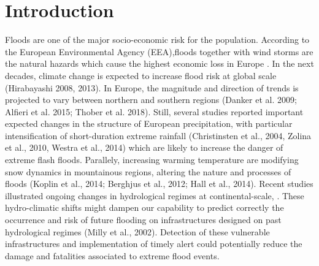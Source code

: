 \chapter{Introduction}
\label{chp:introduction}

\newcommand{\keyword}[1]{\textbf{#1}}
\newcommand{\tabhead}[1]{\textbf{#1}}
\newcommand{\code}[1]{\texttt{#1}}
\newcommand{\file}[1]{\texttt{\bfseries#1}}
\newcommand{\option}[1]{\texttt{\itshape#1}}

Floods are one of the major socio-economic risk for the population. According to the European Environmental Agency (EEA),floods together with wind storms are the natural hazards which cause the highest economic loss  
in Europe \autocite{european_environment_agency_flood_2013}.
In the next decades, climate change is expected to increase flood risk at global scale \autocite{milly_increasing_2002}(Hirabayashi 2008, 2013). In Europe, the magnitude and direction of trends is projected to vary between northern and southern regions (Danker et al. 2009; Alfieri et al. 2015; Thober et al. 2018). Still, several studies reported important expected changes in the structure of European precipitation, with particular intensification of short-duration extreme rainfall (Christinsten et al., 2004, Zolina et al., 2010, Westra et al., 2014) which are likely to increase the danger of extreme flash floods. 
Parallely, increasing warming temperature are modifying snow dynamics in mountainous regions, altering the nature and processes of floods (Koplin et al., 2014; Berghjus et al., 2012; Hall et al., 2014). 
Recent studies illustrated ongoing changes in hydrological regimes at continental-scale\autocite{bloschl_increasing_2017}, \autocite{stahl_filling_2012}.
These hydro-climatic shifts might dampen our capability to predict correctly the occurrence and risk of future flooding on infrastructures designed on past hydrological regimes (Milly et al., 2002).
Detection of these vulnerable infrastructures and implementation of timely alert could potentially reduce the damage and fatalities associated to extreme flood events.
 

